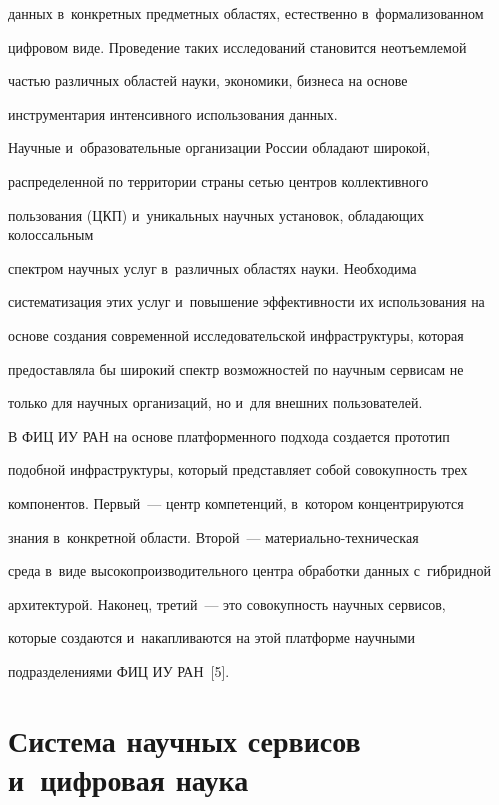 данных в~конкретных предметных областях, естественно в~формализованном 

цифровом виде. Проведение таких исследований становится неотъемлемой 

частью различных областей науки, экономики, бизнеса на основе 

инструментария интенсивного использования данных. 

     

     Научные и~образовательные организации России обладают широкой, 

распределенной по территории страны сетью центров коллективного 

пользования (ЦКП) и~уникальных научных установок, обладающих колоссальным 

спектром научных услуг в~различных областях науки. Необходима 

систематизация этих услуг и~повышение эффективности их использования на 

основе создания современной исследовательской инфраструктуры, которая 

предоставляла бы широкий спектр возможностей по научным сервисам не 

только для научных организаций, но и~для внешних пользователей. 

     

     В ФИЦ ИУ РАН на основе платформенного подхода создается прототип 

подобной инфраструктуры, который представляет собой совокупность трех 

компонентов. Первый~--- центр компетенций, в~котором концентрируются 

знания в~конкретной области. Второй~--- ма\-те\-ри\-аль\-но-тех\-ни\-че\-ская 

среда в~виде высокопроизводительного центра обработки данных с~гибридной 

архитектурой. Наконец, третий~--- это совокупность научных сервисов, 

которые создаются и~накапливаются на этой платформе научными 

подразделениями ФИЦ ИУ РАН~[5].



\vspace*{-6pt} 

     

\section{Система научных сервисов и~цифровая наука}



